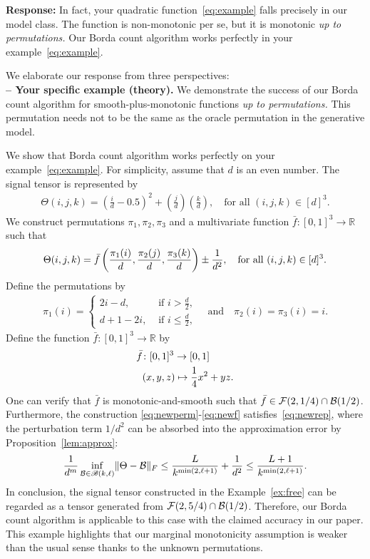 \documentclass[11pt]{article}
\theoremstyle{plain}
\theoremstyle{definition}
\def\caliB{\mathscr{B}}
\begin{document}
\begin{enumerate}[wide, labelwidth=!, labelindent=0pt]
        \textbf{Response:} In fact, your quadratic function~\eqref{eq:example} falls precisely in our model class. The function is non-monotonic per se, but it is monotonic \emph{up to permutations.} Our Borda count algorithm works perfectly in your example~\eqref{eq:example}.
      
    We elaborate our response from three perspectives: \\  
    {\bf -- Your specific example (theory).} We demonstrate the success of our Borda count algorithm for smooth-plus-monotonic functions \emph{up to permutations.} This permutation needs not to be the same as the oracle permutation in the generative model. 
    
    We show that Borda count algorithm works perfectly on your example~\eqref{eq:example}. For simplicity, assume that $d$ is an even number. The signal tensor is represented by
    \begin{align}\label{eq:model6}
       \Theta(i,j,k) = \left(\frac{i}{d}-0.5\right)^2+\left(\frac{j}{d}\right)\left(\frac{k}{d}\right),\quad \text{for all }(i,j,k)\in[d]^3.
    \end{align}
    We construct permutations $\pi_1,\pi_2,\pi_3$ and a multivariate function $\bar f\colon [0,1]^3\rightarrow \mathbb{R}$ such that
    \begin{align}\label{eq:newrep}
        \Theta(i,j,k) = \bar f\left(\frac{\pi_1(i)}{d},\frac{\pi_2(j)}{d},\frac{\pi_3(k)}{d}\right)\pm{1\over d^2},\quad \text{for all }(i,j,k)\in[d]^3.
    \end{align}
Define the permutations by
    \begin{align}\label{eq:newperm}
        \pi_1(i) = \begin{cases}
            2i-d, &\text{ if } i> \frac{d}{2},\\ d+1-2i, &\text{ if } i\leq \frac{d}{2},
        \end{cases}\quad\text{and}\quad  \pi_2 (i)= \pi_3 (i) = i.
    \end{align}
Define the function $\bar f\colon [0,1]^3\rightarrow \mathbb{R}$ by 
\begin{align}\label{eq:newf}
\bar f&\colon [0,1]^3\to [0,1]\notag \\
&(x,y,z)\mapsto {1\over 4} x^2+yz.
\end{align}
One can verify that $\bar f$ is monotonic-and-smooth such that $\bar f\in \mathcal{F}(2,1/4)\cap \mathcal{B}(1/2)$. Furthermore, the construction \eqref{eq:newperm}-\eqref{eq:newf} satisfies~\eqref{eq:newrep}, where the perturbation term $1/d^2$ can be absorbed into the approximation error by Proposition~\ref{lem:approx}:
\[
{1\over d^m}\inf_{\tB\in\caliB(k,\ell)}\FnormSize{}{\Theta-\tB} \leq {L \over k^{\min(2,\ell+1)}}+{1\over d^2}\leq {L+1\over k^{\min(2,\ell+1)}}.
\]
In conclusion, the signal tensor constructed in the Example~\ref{ex:free} can be regarded as a tensor generated from $\mathcal{F}(2,5/4)\cap \mathcal{B}(1/2)$. 
Therefore, our Borda count algorithm is applicable to this case with the claimed accuracy in our paper. This example highlights that our marginal monotonicity assumption is weaker than the usual sense thanks to the unknown permutations. 



\end{enumerate}
\end{document}

